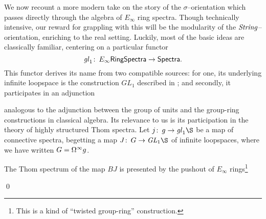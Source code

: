 We now recount a more modern take on the story of the $\sigma$--orientation which passes directly through the algebra of $E_\infty$ ring spectra.  Though technically intensive, our reward for grappling with this will be the modularity of the $\mathit{String}$--orientation, enriching  to the real setting.  Luckily, most of the basic ideas are classically familiar, centering on a particular functor \[\mathit{gl}_1\colon\thinspace E_\infty\mathsf{RingSpectra} \to \mathsf{Spectra}.\]  This functor derives its name from two compatible sources: for one, its underlying infinite loopspace is the construction $GL_1$ described in ; and secondly, it participates in an adjunction
\begin{center}
\end{center}
analogous to the adjunction between the group of units and the group-ring constructions in classical algebra.  Its relevance to us is its participation in the theory of highly structured Thom spectra.  Let $j\co g \to \gl_1 \S$ be a map of connective spectra, begetting a map $J\co G \to \GL_1 \S$ of infinite loopspaces, where we have written $G = \Omega^\infty g$.
\begin{lemma}
The Thom spectrum of the map $BJ$ is presented by the pushout of $E_\infty$ rings\footnote{This is a kind of ``twisted group-ring'' construction.}
\begin{center}
\end{center}
\qed
\end{lemma}

